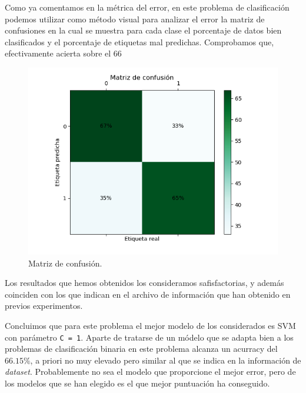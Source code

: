 \documentclass[size=a4, parskip=half, titlepage=false, toc=flat, toc=bib, 12pt]{scrartcl}
\begin{document}
Como ya comentamos en la métrica del error, en este problema de clasificación podemos utilizar como método visual para analizar el error la matriz de confusiones en la cual se muestra para cada clase el porcentaje de datos bien clasificados y el porcentaje de etiquetas mal predichas. Comprobamos que, efectivamente acierta sobre el 66%
\begin{figure}[H]
\centering
\includegraphics[width=1\textwidth]{./img/matrizconfusion}
\caption{Matriz de confusión.}
\end{figure}
Los resultados que hemos obtenidos los consideramos safisfactorias, y además coinciden con los que indican en el archivo de información que han obtenido en previos experimentos.

Concluimos que para este problema el mejor modelo de los considerados es SVM con parámetro \texttt{C = 1}. Aparte de tratarse de un módelo que se adapta bien a los problemas de clasificación binaria en este problema alcanza un acurracy del $66.15\%$, a priori no muy elevado pero similar al que se indica en la información de \textit{dataset}. Probablemente no sea el
modelo que proporcione el mejor error, pero de los modelos que se han elegido es el que mejor puntuación ha conseguido.

\end{document}
